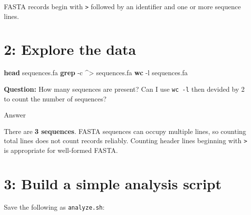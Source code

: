 \documentclass[
]{book}
\newenvironment{Shaded}{\begin{snugshade}}{\end{snugshade}}
\newcommand{\AttributeTok}[1]{\textcolor[rgb]{0.13,0.29,0.53}{#1}}
\newcommand{\BuiltInTok}[1]{#1}
\newcommand{\CommentTok}[1]{\textcolor[rgb]{0.56,0.35,0.01}{\textit{#1}}}
\newcommand{\FunctionTok}[1]{\textcolor[rgb]{0.13,0.29,0.53}{\textbf{#1}}}
\newcommand{\NormalTok}[1]{#1}
\newcommand{\OperatorTok}[1]{\textcolor[rgb]{0.81,0.36,0.00}{\textbf{#1}}}
\newcommand{\StringTok}[1]{\textcolor[rgb]{0.31,0.60,0.02}{#1}}
\newcommand{\VariableTok}[1]{\textcolor[rgb]{0.00,0.00,0.00}{#1}}
\begin{document}
FASTA records begin with \texttt{\textgreater{}} followed by an identifier and one or more sequence lines.

\section{2: Explore the data}\label{explore-the-data}

\begin{Shaded}
\begin{Highlighting}[]
\FunctionTok{head}\NormalTok{ sequences.fa}
\FunctionTok{grep} \AttributeTok{{-}c} \StringTok{\textquotesingle{}\^{}\textgreater{}\textquotesingle{}}\NormalTok{ sequences.fa}
\FunctionTok{wc} \AttributeTok{{-}l}\NormalTok{ sequences.fa}
\end{Highlighting}
\end{Shaded}

\textbf{Question:} How many sequences are present? Can I use \texttt{wc\ -l} then devided by 2 to count the number of sequences?

Answer

There are \textbf{3 sequences}. FASTA sequences can occupy multiple lines, so counting total lines does not count records reliably. Counting header lines beginning with \texttt{\textgreater{}} is appropriate for well-formed FASTA.

\section{3: Build a simple analysis script}\label{build-a-simple-analysis-script}

Save the following as \texttt{analyze.sh}:

\begin{Shaded}
\end{Shaded}
\end{document}
